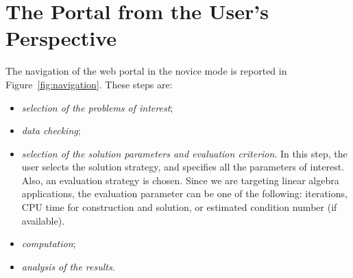 \documentclass[11pt,relax]{SANDreport}
\begin{document}
\section{The Portal from the User's Perspective}
\label{sec:navigation}

The navigation of the web portal in the novice mode is reported in
Figure~\ref{fig:navigation}. These steps are:
\begin{itemize}
\setlength{\itemsep}{0pt}
\item {\sl selection of the problems of interest};
\item {\sl data checking};
\item {\sl selection of the solution parameters and evaluation criterion}.
In this step, the user selects the solution strategy, and specifies all the
parameters of interest. Also, an evaluation strategy is chosen. Since we are
targeting linear algebra applications, the evaluation parameter can be one of
the following: iterations, CPU time for construction and solution, or
estimated condition number (if available).
\item {\sl computation};
\item {\sl analysis of the results}.
\end{itemize}
\end{document}
